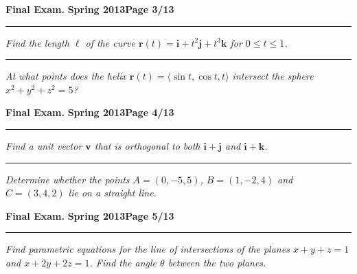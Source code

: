 \documentclass[12pt]{article}
\begin{document}
\hfill{\large\bf Final Exam.}\hfill{\large\bf
  Spring 2013}\hfill{\large\bf Page 3/13}\hrule

\bigskip
{\problem[15 pts] \em Find the length $\ell$ of the curve $\boldsymbol{r}(t) =
\boldsymbol{i} + t^2 \boldsymbol{j} + t^3 \boldsymbol{k}$ for $0 \leq t \leq
1$.} 
\vspace{9.5cm}
\begin{flushright}
\end{flushright}
\hrule
{\problem[10 pts] \em At what points does the helix $\boldsymbol{r}(t) = \langle \sin t, \cos t, t \rangle$ intersect the sphere $x^2+y^2+z^2=5$?}
\vspace{7.5cm}
\begin{flushright}
\end{flushright}
\newpage

\hfill{\large\bf Final Exam.}\hfill{\large\bf
  Spring 2013}\hfill{\large\bf Page 4/13}\hrule

\bigskip
{\problem[15 pts] \em Find a unit vector $\boldsymbol{v}$ that is orthogonal
to both $\boldsymbol{i} + \boldsymbol{j}$ and $\boldsymbol{i} +
\boldsymbol{k}$.} 
\vspace{11cm}
\begin{flushright}
\end{flushright}
\hrule
{\problem[10 pts] \em Determine whether the points $A=(0,-5,5)$, $ B=
(1,-2,4)$ and $C=(3,4,2)$ lie on a straight line.}
\newpage

\hfill{\large\bf Final Exam.}\hfill{\large\bf
  Spring 2013}\hfill{\large\bf Page 5/13}\hrule

\bigskip
{\problem[20 pts] \em Find parametric equations for the line of intersections
of the planes $x+y+z=1$ and $x+2y+2z=1$.  Find the angle $\theta$ between the
two planes.}
\vspace{18.5cm}
\begin{flushright}
\end{flushright}
\end{document}
